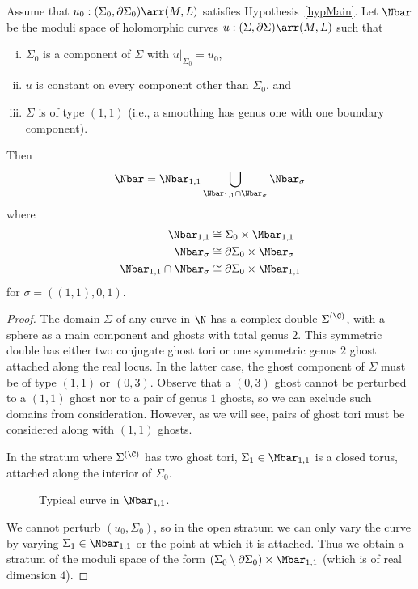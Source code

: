 \begin{proposition} \label{base11}
Assume that $u_0:(\Sigma_0,\partial\Sigma_0) \arr (M,L)$ satisfies Hypothesis~\ref{hypMain}. Let $\Nbar$ be the moduli space of holomorphic curves $u:(\Sigma,\partial\Sigma)\arr(M,L)$ such that
\begin{enumerate}[(i)]
\item $\Sigma_0$ is a component of $\Sigma$ with $u|_{\Sigma_0}=u_0$,
\item $u$ is constant on every component other than $\Sigma_0$, and 
\item $\Sigma$ is of type $(1,1)$ (i.e., a smoothing has genus one with one boundary component).
\end{enumerate}
Then
\[
\Nbar = \Nbar_{1,1} \bigcup\limits_{\Nbar_{1,1} \cap \Nbar_\sigma} \Nbar_\sigma
\]
where
\begin{align*}
\Nbar_{1,1} & \cong \Sigma_0 \times \Mbar_{1,1}
\\
\Nbar_\sigma & \cong \partial\Sigma_0 \times \Mbar_\sigma
\\
\Nbar_{1,1} \cap \Nbar_\sigma & \cong \partial\Sigma_0 \times \Mbar_{1,1}
\end{align*}
for $\sigma=((1,1),0,1)$.
\begin{proof}
The domain $\Sigma$ of any curve in $\N$ has a complex double $\Sigma^{(\C)}$, with a sphere as a main component and ghosts with total genus $2$. This symmetric double has either two conjugate ghost tori or one symmetric genus $2$ ghost attached along the real locus. In the latter case, the ghost component of $\Sigma$ must be of type $(1,1)$ or $(0,3)$. Observe that a $(0,3)$ ghost cannot be perturbed to a $(1,1)$ ghost nor to a pair of genus $1$ ghosts, so we can exclude such domains from consideration. However, as we will see, pairs of ghost tori must be considered along with $(1,1)$ ghosts.

In the stratum where $\Sigma^{(\C)}$ has two ghost tori, $\Sigma_1 \in \Mbar_{1,1}$ is a closed torus, attached along the interior of $\Sigma_0$.
\begin{figure}[ht]
\centering
{}
\caption{Typical curve in $\Nbar_{1,1}$.}
\label{pic11}
\end{figure}
We cannot perturb $(u_0,\Sigma_0)$, so in the open stratum we can only vary the curve by varying $\Sigma_1 \in \Mbar_{1,1}$ or the point at which it is attached. Thus we obtain a stratum of the moduli space of the form $(\Sigma_0\setminus\partial\Sigma_0) \times \Mbar_{1,1}$ (which is of real dimension $4$).


\end{proof}
\end{proposition}

